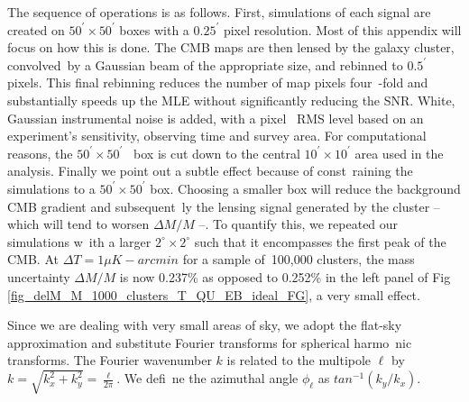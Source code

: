 The sequence of operations is as follows. First, simulations of each signal are created on $50^\prime \times 50^\prime$ boxes with a $0.25^\prime$ pixel resolution. Most of this appendix will focus on how this is done. The CMB maps are then lensed by the galaxy cluster, convolved\
 by a Gaussian beam of the appropriate size, and rebinned to $0.5^\prime$ pixels. This final rebinning reduces the number of map pixels four\
-fold and substantially speeds up the MLE without significantly reducing the SNR. White, Gaussian instrumental noise is added, with a pixel \
RMS level based on an experiment's sensitivity, observing time and survey area. For computational reasons, the $50^\prime \times 50^\prime$ \
box is cut down to the central $10^\prime \times 10^\prime$ area used in the analysis. Finally we point out a subtle effect because of const\
raining the simulations to a $50^\prime \times 50^\prime$ box. Choosing a smaller box will reduce the background CMB gradient and subsequent\
ly the lensing signal generated by the cluster -- which will tend to worsen $\Delta M/M$ --. To quantify this, we repeated our simulations w\
ith a larger $2^{\circ} \times 2^{\circ}$ such that it encompasses the first peak of the CMB. At $\Delta T = 1 \mu K-arcmin$ for a sample of\
 100,000 clusters, the mass uncertainty $\Delta M/M$ is now 0.237\% as opposed to 0.252\% in the left panel of Fig \ref{fig_delM_M_1000_clusters_T_QU_EB_ideal_FG}, a very small effect.

Since we are dealing with very small areas of sky, we adopt the flat-sky approximation and substitute Fourier transforms for spherical harmo\
nic transforms. The Fourier wavenumber $k$ is related to the multipole $\ell$ by $k = \sqrt{k_x^{2} + k_y^{2}} = \frac{\ell}{2\pi}$. We defi\
ne the azimuthal angle $\phi_{\ell}$ as $tan^{-1}(k_{y} / k_x)$.
